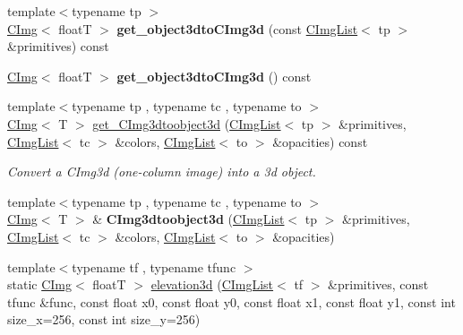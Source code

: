 \begin{DoxyCompactItemize}
\item 
\hypertarget{structcimg__library_1_1CImg_a9ec34ffefe0355ed2596d22ae1104fa8}{
{\footnotesize template$<$typename tp $>$ }\\\hyperlink{structcimg__library_1_1CImg}{CImg}$<$ floatT $>$ {\bfseries get\_\-object3dtoCImg3d} (const \hyperlink{structcimg__library_1_1CImgList}{CImgList}$<$ tp $>$ \&primitives) const }
\label{structcimg__library_1_1CImg_a9ec34ffefe0355ed2596d22ae1104fa8}

\item 
\hypertarget{structcimg__library_1_1CImg_a6bcf8068cd87c9780af4ecd5c59f2fad}{
\hyperlink{structcimg__library_1_1CImg}{CImg}$<$ floatT $>$ {\bfseries get\_\-object3dtoCImg3d} () const }
\label{structcimg__library_1_1CImg_a6bcf8068cd87c9780af4ecd5c59f2fad}

\item 
\hypertarget{structcimg__library_1_1CImg_a9855ef32bd6b81bc031add5f881e156f}{
{\footnotesize template$<$typename tp , typename tc , typename to $>$ }\\\hyperlink{structcimg__library_1_1CImg}{CImg}$<$ T $>$ \hyperlink{structcimg__library_1_1CImg_a9855ef32bd6b81bc031add5f881e156f}{get\_\-CImg3dtoobject3d} (\hyperlink{structcimg__library_1_1CImgList}{CImgList}$<$ tp $>$ \&primitives, \hyperlink{structcimg__library_1_1CImgList}{CImgList}$<$ tc $>$ \&colors, \hyperlink{structcimg__library_1_1CImgList}{CImgList}$<$ to $>$ \&opacities) const }
\label{structcimg__library_1_1CImg_a9855ef32bd6b81bc031add5f881e156f}

\begin{DoxyCompactList}\small\item\em Convert a CImg3d (one-\/column image) into a 3d object. \item\end{DoxyCompactList}\item 
\hypertarget{structcimg__library_1_1CImg_acd68d7a1009e4be28bf327cef2d75acf}{
{\footnotesize template$<$typename tp , typename tc , typename to $>$ }\\\hyperlink{structcimg__library_1_1CImg}{CImg}$<$ T $>$ \& {\bfseries CImg3dtoobject3d} (\hyperlink{structcimg__library_1_1CImgList}{CImgList}$<$ tp $>$ \&primitives, \hyperlink{structcimg__library_1_1CImgList}{CImgList}$<$ tc $>$ \&colors, \hyperlink{structcimg__library_1_1CImgList}{CImgList}$<$ to $>$ \&opacities)}
\label{structcimg__library_1_1CImg_acd68d7a1009e4be28bf327cef2d75acf}

\item 
\hypertarget{structcimg__library_1_1CImg_a3746f3ffaa0bf8fdd32005ddd3f169e1}{
{\footnotesize template$<$typename tf , typename tfunc $>$ }\\static \hyperlink{structcimg__library_1_1CImg}{CImg}$<$ floatT $>$ \hyperlink{structcimg__library_1_1CImg_a3746f3ffaa0bf8fdd32005ddd3f169e1}{elevation3d} (\hyperlink{structcimg__library_1_1CImgList}{CImgList}$<$ tf $>$ \&primitives, const tfunc \&func, const float x0, const float y0, const float x1, const float y1, const int size\_\-x=256, const int size\_\-y=256)}
\label{structcimg__library_1_1CImg_a3746f3ffaa0bf8fdd32005ddd3f169e1}


\end{DoxyCompactItemize}
